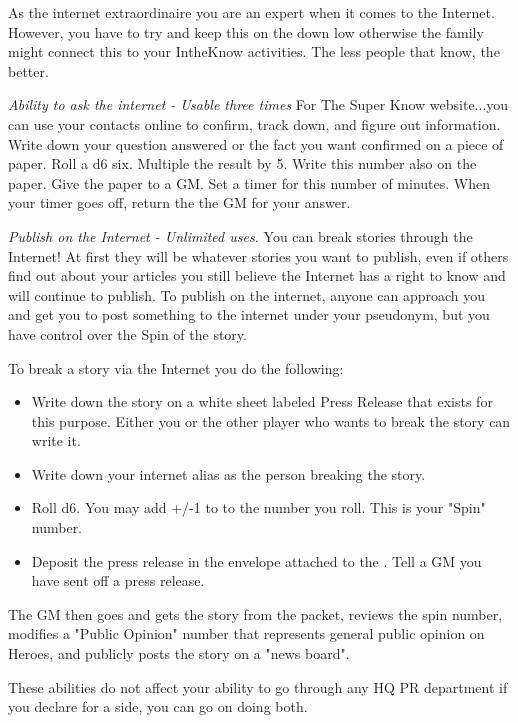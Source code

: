 \documentclass[green]{LRSguildcamp1}
\begin{document}
\name{\gInternetPR{}}

As \cTween{} the internet extraordinaire you are an expert when it comes to the Internet. However, you have to try and keep this on the down low otherwise the family might connect this to your IntheKnow activities. The less people that know, the better. 

\textit{Ability to ask the internet - Usable three times
}
For The Super Know website...you can use your contacts online to confirm, track down, and figure out information. Write down your question answered or the fact you want confirmed on a piece of paper. Roll a d6 six. Multiple the result by 5. Write this number also on the paper. Give the paper to a GM. Set a timer for this number of minutes. When your timer goes off, return the the GM for your answer. 

\textit{Publish on the Internet - Unlimited uses.
}
You can break stories through the Internet! At first they will be whatever stories you want to publish, even if others find out about your articles you still believe the Internet has a right to know and will continue to publish. To publish on the internet, anyone can approach you and get you to post something to the internet under your pseudonym, but you have control over the Spin of the story. 

To break a story via the Internet you do the following:
\begin {itemize}
\item Write down the story on a white sheet labeled Press Release that exists for this purpose. Either you or the other player who wants to break the story can write it. 
\item Write down your internet alias as the person breaking the story.  
\item Roll d6.  You may add +/-1 to to the number you roll. This is your "Spin" number.
\item Deposit the press release in the envelope attached to the \sComputer{}. 
Tell a GM you have sent off a press release.
\end{itemize}

The GM then goes and gets the story from the packet, reviews the spin number, modifies a "Public Opinion" number that represents general public opinion on Heroes, and publicly posts the story on a "news board". 


These abilities do not affect your ability to go through any HQ PR department if you declare for a side, you can go on doing both. 
\end{document}
